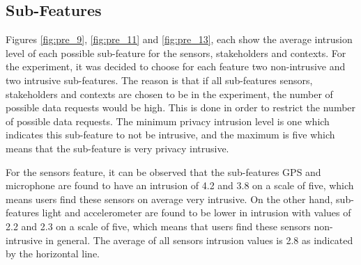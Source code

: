 \subsection{Sub-Features}

%
%


Figures \ref{fig:pre_9}, \ref{fig:pre_11} and \ref{fig:pre_13}, each show the average intrusion level of each possible sub-feature for
the sensors, stakeholders and contexts. For the experiment, it was decided to choose for each feature two non-intrusive and two intrusive sub-features. The reason is that if all sub-features sensors, stakeholders and contexts are chosen to be in the experiment, the number of possible data requests would be high. This is done in order to restrict the number of possible data requests. The minimum privacy intrusion level is one which indicates this sub-feature to not be intrusive, and the maximum is five which means that the sub-feature is very privacy intrusive.

For the sensors feature, it can be observed that the sub-features GPS and microphone are found to have an intrusion of 4.2 and 3.8 on a scale of five, which means users find these sensors on average very intrusive. On the other hand, sub-features light and accelerometer are found to be lower in intrusion with values of 2.2 and 2.3 on a scale of five, which means that users find these sensors non-intrusive in general. The average of all sensors intrusion values is 2.8 as indicated by the horizontal line.

